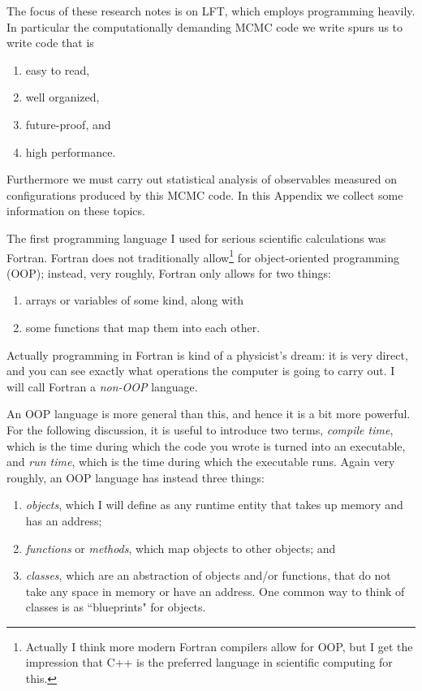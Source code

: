 The focus of these research notes is on LFT, which employs programming heavily.
In particular the computationally demanding MCMC code we write spurs us to
write code that is
\begin{enumerate}
  \item easy to read,
  \item well organized,
  \item future-proof, and
  \item high performance.
\end{enumerate}
Furthermore we must carry out statistical analysis of observables measured on
configurations produced by this MCMC code. In this Appendix we collect
some information on these topics.


The first programming language I used for serious scientific calculations
was Fortran. Fortran does not traditionally 
allow\footnote{Actually I think more modern Fortran compilers 
allow for OOP, but I get the impression that C++ is the preferred language
in scientific computing for this.} for object-oriented programming (OOP); 
instead, very roughly, Fortran only
allows for two things:
\begin{enumerate}
  \item arrays or variables of some kind, along with 
  \item some functions that map them into each other.
\end{enumerate}
Actually programming in Fortran is kind
of a physicist's dream: it is very direct, and you can see exactly what
operations the computer is going to carry out. I will call Fortran
a {\it non-OOP} language.

An OOP language is more general than this, and hence it is a bit more powerful.
For the following discussion, it is useful to introduce two terms,
{\it compile time}, which is the time during which the code you wrote
is turned into an executable, and {\it run time}, which is the time during
which the executable runs.
Again very roughly, an OOP language has instead three things:
\begin{enumerate}
  \item {\it objects}, which I will define as any runtime entity that 
        takes up memory and has an address;
  \item {\it functions} or {\it methods}, which map objects to other
        objects; and
  \item {\it classes}, which are an abstraction of objects and/or functions,
        that do not take any space in memory or have an address. One common
        way to think of classes is as ``blueprints" for objects.
\end{enumerate}

